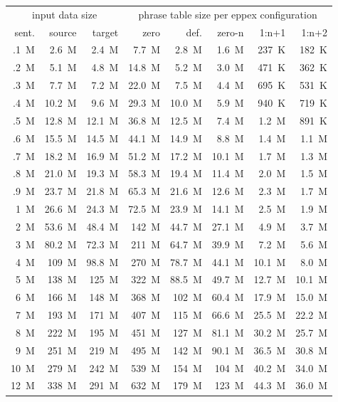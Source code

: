 \begin{table}[!htb]
\centering
\def\arraystretch{1.1}
\begin{tabular}{ | r  r  r | r  r  r  r  r | }
\hline
\multicolumn{3}{|c|}{input data size} & \multicolumn{5}{|c|}{phrase table size per eppex configuration} \\
sent. & source & target & zero & def. & zero-n & 1:n+1 & 1:n+2 \\
\hline
\hline
.1~M & 2.6~M & 2.4~M & 7.7~M & 2.8~M & 1.6~M & 237~K & 182~K \\
.2~M & 5.1~M & 4.8~M & 14.8~M & 5.2~M & 3.0~M & 471~K & 362~K \\
.3~M & 7.7~M & 7.2~M & 22.0~M & 7.5~M & 4.4~M & 695~K & 531~K \\
.4~M & 10.2~M & 9.6~M & 29.3~M & 10.0~M & 5.9~M & 940~K & 719~K \\
.5~M & 12.8~M & 12.1~M & 36.8~M & 12.5~M & 7.4~M & 1.2~M & 891~K \\
.6~M & 15.5~M & 14.5~M & 44.1~M & 14.9~M & 8.8~M & 1.4~M & 1.1~M \\
.7~M & 18.2~M & 16.9~M & 51.2~M & 17.2~M & 10.1~M & 1.7~M & 1.3~M \\
.8~M & 21.0~M & 19.3~M & 58.3~M & 19.4~M & 11.4~M & 2.0~M & 1.5~M \\
.9~M & 23.7~M & 21.8~M & 65.3~M & 21.6~M & 12.6~M & 2.3~M & 1.7~M \\
1~M & 26.6~M & 24.3~M & 72.5~M & 23.9~M & 14.1~M & 2.5~M & 1.9~M \\
2~M & 53.6~M & 48.4~M & 142~M & 44.7~M & 27.1~M & 4.9~M & 3.7~M \\
3~M & 80.2~M & 72.3~M & 211~M & 64.7~M & 39.9~M & 7.2~M & 5.6~M \\
4~M & 109~M & 98.8~M & 270~M & 78.7~M & 44.1~M & 10.1~M & 8.0~M \\
5~M & 138~M & 125~M & 322~M & 88.5~M & 49.7~M & 12.7~M & 10.1~M \\
6~M & 166~M & 148~M & 368~M & 102~M & 60.4~M & 17.9~M & 15.0~M \\
7~M & 193~M & 171~M & 407~M & 115~M & 66.6~M & 25.5~M & 22.2~M \\
8~M & 222~M & 195~M & 451~M & 127~M & 81.1~M & 30.2~M & 25.7~M \\
9~M & 251~M & 219~M & 495~M & 142~M & 90.1~M & 36.5~M & 30.8~M \\
10~M & 279~M & 242~M & 539~M & 154~M & 104~M & 40.2~M & 34.0~M \\
12~M & 338~M & 291~M & 632~M & 179~M & 123~M & 44.3~M & 36.0~M \\

\end{tabular}
\end{table}
